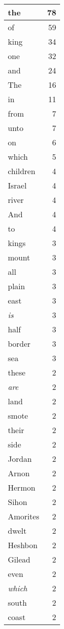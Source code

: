 \begin{center}
\begin{longtable}{l|r}
\hline \hline
\endlastfoot
the & 78 \\ \hline
of & 59 \\ \hline
king & 34 \\ \hline
one & 32 \\ \hline
and & 24 \\ \hline
The & 16 \\ \hline
in & 11 \\ \hline
from & 7 \\ \hline
unto & 7 \\ \hline
on & 6 \\ \hline
which & 5 \\ \hline
children & 4 \\ \hline
Israel & 4 \\ \hline
river & 4 \\ \hline
And & 4 \\ \hline
to & 4 \\ \hline
kings & 3 \\ \hline
mount & 3 \\ \hline
all & 3 \\ \hline
plain & 3 \\ \hline
east & 3 \\ \hline
\emph{is} & 3 \\ \hline
half & 3 \\ \hline
border & 3 \\ \hline
sea & 3 \\ \hline
these & 2 \\ \hline
\emph{are} & 2 \\ \hline
land & 2 \\ \hline
smote & 2 \\ \hline
their & 2 \\ \hline
side & 2 \\ \hline
Jordan & 2 \\ \hline
Arnon & 2 \\ \hline
Hermon & 2 \\ \hline
Sihon & 2 \\ \hline
Amorites & 2 \\ \hline
dwelt & 2 \\ \hline
Heshbon & 2 \\ \hline
Gilead & 2 \\ \hline
even & 2 \\ \hline
\emph{which} & 2 \\ \hline
south & 2 \\ \hline
coast & 2 \\ \hline

\end{longtable}
\end{center}
